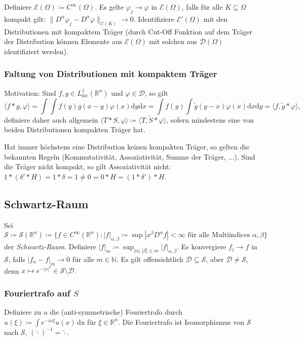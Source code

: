 \documentclass[11pt,a4paper]{scrartcl}
\newcommand{\N}{\mathbb{N}} %
\newcommand{\R}{\mathbb{R}} %
\newcommand{\D}{\mathcal{D}}
\newcommand{\E}{\mathcal{E}}
\newcommand{\Sc}{\mathcal{S}}
\theoremstyle{plain}
\theoremstyle{definition}
\theoremstyle{remark}
\begin{document}
Definiere $\E(\Omega) \coloneqq C^\infty(\Omega)$. Es gelte $\varphi_j \to \varphi$ in $\E(\Omega)$, falls für alle $K\subseteq \Omega$ kompakt gilt: $\|D^\alpha \varphi_j - D^\alpha \varphi \|_{C(K)} \to 0$.  Identifiziere $\E'(\Omega)$ mit den Distributionen mit kompaktem Träger (durch Cut-Off Funktion auf dem Träger der Distribution können Elemente aus $\E(\Omega)$ mit solchen aus $\D(\Omega)$ identifiziert werden).

\subsubsection{Faltung von Distributionen mit kompaktem Träger}

Motivation: Sind $f,g\in L^1_\mathrm{loc}(\R^n)$ und $\varphi\in \D$, so gilt $$\langle f\ast g, \varphi \rangle = \int \int f(y) g(x-y) \varphi(x) \mathrm{d}y \mathrm{d}x = \int f(y) \int \tilde g(y-x) \varphi(x) \mathrm{d}x \mathrm{d}y = \langle f, \tilde g \ast \varphi \rangle,$$ definiere daher auch allgemein $\langle T\ast S, \varphi \rangle \coloneqq \langle T, \tilde S \ast \varphi \rangle$, sofern mindestens eine von beiden Distributionen kompakten Träger hat.

Hat immer höchstens eine Distribution keinen kompakten Träger, so gelten die bekannten Regeln (Kommutativität, Assoziativität, Summe der Träger, ...).  Sind die Träger nicht kompakt, so gilt Assoziativität nicht: $1*(\delta'*H)=1*\delta=1\neq 0=0*H=(1*\delta')*H$.

\subsection{Schwartz-Raum}

Sei $\Sc\coloneqq \Sc(\R^n)\coloneqq \{ f\in C^\infty(\R^n): |f|_{\alpha,\beta} \coloneqq \sup |x^\beta D^\alpha f| < \infty \text{ für alle Multiindices } \alpha, \beta \}$ der \emph{Schwartz-Raum}. Definiere $|f|_m \coloneqq \sup_{|\alpha|,|\beta| \leq m} |f|_{\alpha,\beta}$. Es konvergiere $f_j \to f$ in $\Sc$, falls $|f_n-f|_m \to 0$ für alle $m\in \N$. Es gilt offensichtlich $\D \subseteq \Sc$, aber $\D \neq \Sc$, denn $x\mapsto e^{-|x|^2} \in \Sc\setminus \D$.


\subsubsection{Fouriertrafo auf $S$}

Definiere zu $u$ die (anti-symmetrische) Fouriertrafo durch $\hat u(\xi)\coloneqq \int e^{-ix\xi}u(x) \, \mathrm{dx}$ für $\xi\in\R^n$. Die Fouriertrafo ist Isomorphismus von $\Sc$ nach $\Sc$, $(\hat \cdot )^{-1} = \check\cdot$.
\end{document}
